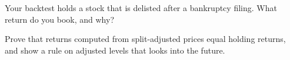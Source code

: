 \begin{interviewq}\label{iq:rs:universe-symbology-and-corporate-actions:5}
Your backtest holds a stock that is delisted after a bankruptcy filing. What return do you book, and why?
\end{interviewq}

\begin{interviewq}\label{iq:rs:universe-symbology-and-corporate-actions:6}
Prove that returns computed from split-adjusted prices equal holding returns, and show a rule on adjusted levels that looks into the
future.
\end{interviewq}
